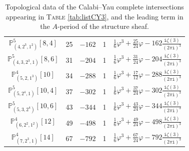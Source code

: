 \documentclass[12pt,a4paper,oneside]{amsart}
\numberwithin{equation}{section}
\theoremstyle{definition}
\theoremstyle{remark}
\newcommand{\cP}{\mathbb{P}}
\newcommand{\ii}{\mathtt{i}}
\begin{document}
\begin{table}[th]
\begin{tabular}{|c |c |c |c | c|}
	$\cP_{(4,2^3,1^2)}^{5} [8,4]$ & 25 & $-162$ & 1 & $\frac{1}{6} \varphi^3 + \frac{25}{24} \varphi - 162\frac{\ii \zeta (3)}{(2\pi\ii)^3}$  \\
	$\cP_{(4,3,2^3,1)}^{5} [8,6]$ & 31 & $-204$ & 1 & $\frac{1}{6} \varphi^3 + \frac{31}{24} \varphi - 204\frac{\ii \zeta (3)}{(2\pi\ii)^3}$ \\
	$\cP^{4}_{(5,2,1^3)} [10]$ & 34 & $-288$ & 1 & $\frac{1}{6} \varphi^3 + \frac{17}{12} \varphi - 288\frac{\ii \zeta (3)}{(2\pi\ii)^3}$ \\
	$\cP^{5}_{(5,2^4,1)} [10,4]$ & 37 & $-302$ & 1 & $\frac{1}{6} \varphi^3 + \frac{37}{24} \varphi - 302\frac{\ii \zeta (3)}{(2\pi\ii)^3}$ \\
	$\cP^{5}_{(5,3,2^4)} [10,6]$ & 43 & $-344$ & 1 & $\frac{1}{6} \varphi^3 + \frac{43}{24} \varphi - 344\frac{\ii \zeta (3)}{(2\pi\ii)^3}$  \\
	$\cP^{4}_{(6,2^2,1^2)} [12]$ & 49 & $-498$ & 1 & $\frac{1}{6} \varphi^3 + \frac{49}{24} \varphi - 498\frac{\ii \zeta (3)}{(2\pi\ii)^3}$ \\	
	$\cP^{4}_{(7,2^3,1)} [14]$ & 67 & $-792$ & 1 & $\frac{1}{6} \varphi^3 + \frac{67}{24} \varphi - 792\frac{\ii \zeta (3)}{(2\pi\ii)^3}$  \\
	\hline
\end{tabular}
\caption{Topological data of the Calabi--Yau complete intersections appearing in \textsc{Table} \ref{tab:listCY3}, and the leading term in the $A$-period of the structure sheaf.}
\label{tab:Xnumbers}
\end{table}\par
\end{document}
